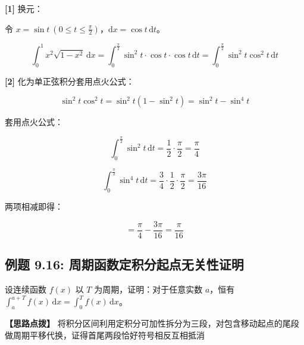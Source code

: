 \documentclass[11pt,a4paper,UTF8]{ctexart}
\begin{document}
\begin{solbox}[分步推导与答题规范]
\textbf{[1]} 换元：

令 $x = \sin t \ (0 \leqslant t \leqslant \frac{\pi}{2})$，$\mathrm{d}x = \cos t\,\mathrm{d}t$。


\begin{equation*}
\int_0^1 x^2\sqrt{1-x^2}\,\mathrm{d}x = \int_0^{\frac{\pi}{2}} \sin^2 t \cdot \cos t \cdot \cos t\,\mathrm{d}t = \int_0^{\frac{\pi}{2}} \sin^2 t \cos^2 t\,\mathrm{d}t
\end{equation*}


\textbf{[2]} 化为单正弦积分套用点火公式：


\begin{equation*}
\sin^2 t \cos^2 t = \sin^2 t(1 - \sin^2 t) = \sin^2 t - \sin^4 t
\end{equation*}


套用点火公式：


\begin{equation*}
\int_0^{\frac{\pi}{2}} \sin^2 t\,\mathrm{d}t = \frac{1}{2} \cdot \frac{\pi}{2} = \frac{\pi}{4}
\end{equation*}



\begin{equation*}
\int_0^{\frac{\pi}{2}} \sin^4 t\,\mathrm{d}t = \frac{3}{4} \cdot \frac{1}{2} \cdot \frac{\pi}{2} = \frac{3\pi}{16}
\end{equation*}


两项相减即得：


\begin{equation*}
= \frac{\pi}{4} - \frac{3\pi}{16} = \frac{\pi}{16}
\end{equation*}

\end{solbox}


\subsection{例题 9.16: 周期函数定积分起点无关性证明}

设连续函数 $f(x)$ 以 $T$ 为周期，证明：对于任意实数 $a$，恒有 $\int_a^{a+T} f(x)\,\mathrm{d}x = \int_0^T f(x)\,\mathrm{d}x$。

\textbf{\color{DeepPurple}【思路点拨】} 将积分区间利用定积分可加性拆分为三段，对包含移动起点的尾段做周期平移代换，证得首尾两段恰好符号相反互相抵消
\end{document}
